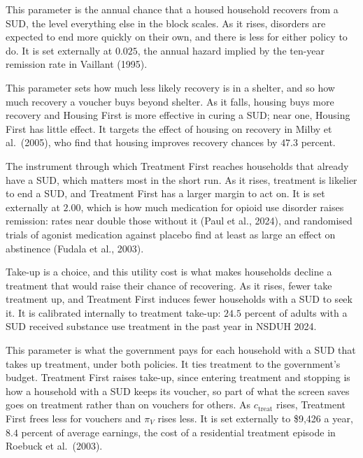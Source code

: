 \documentclass[10pt]{article}
\begin{document}
\begin{description}\setlength{\itemsep}{0.25em}\setlength{\parskip}{0em}
\item[$\bar\pi_r$, the baseline SUD recovery rate.] This parameter is the annual chance that a housed household recovers from a SUD, the level everything else in the block scales. As it rises, disorders are expected to end more quickly on their own, and there is less for either policy to do. It is set externally at $0.025$, the annual hazard implied by the ten-year remission rate in Vaillant (1995). 
 \item[$\mu_H$, SUD recovery when homeless.] This parameter sets how much less likely recovery is in a shelter, and so how much recovery a voucher buys beyond shelter. As it falls, housing buys more recovery and Housing First is more effective in curing a SUD; near one, Housing First has little effect. It targets the effect of housing on recovery in Milby et al.\ (2005), who find that housing improves recovery chances by $47.3$ percent.
\item[$g$, the treatment effect on recovery.] The instrument through which Treatment First reaches households that already have a SUD, which matters most in the short run. As it rises, treatment is likelier to end a SUD, and Treatment First has a larger margin to act on. It is set externally at $2.00$, which is how much medication for opioid use disorder raises remission: rates near double those without it (Paul et al., 2024), and randomised trials of agonist medication against placebo find at least as large an effect on abstinence (Fudala et al., 2003).
\item[$\bar\tau^{u}$, the utility cost of treatment.] Take-up is a choice, and this utility cost is what makes households decline a treatment that would raise their chance of recovering. As it rises, fewer take treatment up, and Treatment First induces fewer households with a SUD to seek it. It is calibrated internally to treatment take-up: $24.5$ percent of adults with a SUD received substance use treatment in the past year in NSDUH 2024.
\item[$c_{\text{treat}}$, the public cost of a year of treatment.] This parameter is what the government pays for each household with a SUD that takes up treatment, under both policies. It ties treatment to the government's budget. Treatment First raises take-up, since entering treatment and stopping is how a household with a SUD keeps its voucher, so part of what the screen saves goes on treatment rather than on vouchers for others. As $c_{\text{treat}}$ rises, Treatment First frees less for vouchers and $\pi_V$ rises less. It is set externally to \$9,426 a year, $8.4$ percent of average earnings, the cost of a residential treatment episode in Roebuck et al.\ (2003).
\end{description}
\end{document}
